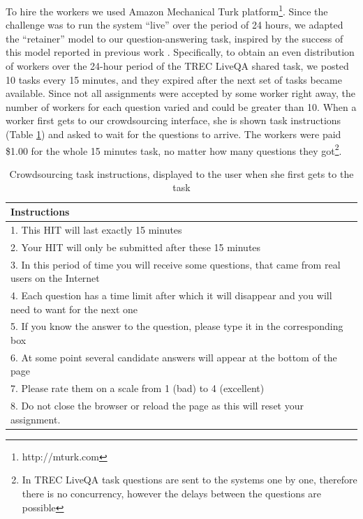 To hire the workers we used Amazon Mechanical Turk platform\footnote{http://mturk.com}.
Since the challenge was to run the system ``live'' over the period of 24 hours, we adapted the ``retainer'' model to our question-answering task, inspired by the success of this model reported in previous work \cite{bernstein2011crowds,bigham2010vizwiz}.
Specifically, to obtain an even distribution of workers over the 24-hour period of the TREC LiveQA shared task, we posted 10 tasks every 15 minutes, and they expired after the next set of tasks became available.
Since not all assignments were accepted by some worker right away, the number of workers for each question varied and could be greater than 10.
When a worker first gets to our crowdsourcing interface, she is shown task instructions (Table \ref{table:crowdsourcing:crqa:crowd_instructions}) and asked to wait for the questions to arrive.
The workers were paid \$1.00 for the whole 15 minutes task, no matter how many questions they got\footnote{In TREC LiveQA task questions are sent to the systems one by one, therefore there is no concurrency, however the delays between the questions are possible}.

\begin{table}[ht]
\centering
\begin{tabular}{| p{15cm} |}
\hline
\textbf{Instructions} \\
\hline
1. This HIT will last exactly 15 minutes\\
2. Your HIT will only be submitted after these 15 minutes\\
3. In this period of time you will receive some questions, that came from real users on the Internet\\
4. Each question has a time limit after which it will disappear and you will need to want for the next one\\
5. If you know the answer to the question, please type it in the corresponding box\\
6. At some point several candidate answers will appear at the bottom of the page\\
7. Please rate them on a scale from 1 (bad) to 4 (excellent)\\
8. Do not close the browser or reload the page as this will reset your assignment.\\
\hline
\end{tabular}
\caption{Crowdsourcing task instructions, displayed to the user when she first gets to the task}
\label{table:crowdsourcing:crqa:crowd_instructions}
\end{table}

